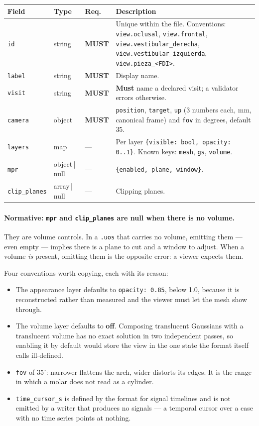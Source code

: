 \documentclass[11pt,a4paper]{article}
\newcommand{\MUST}{\textcolor{uosred}{\textbf{MUST}}}
\newcommand{\code}[1]{\texttt{\small #1}}
\begin{document}
\begin{longtable}{L{2.9cm} L{2.9cm} C{1.2cm} L{7.8cm}}
\toprule
\textbf{Field} & \textbf{Type} & \textbf{Req.} & \textbf{Description}\\
\midrule
\endhead
\code{id} & string & \MUST & Unique within the file. Conventions: \code{view.oclusal},
\code{view.frontal}, \code{view.vestibular\_derecha}, \code{view.vestibular\_izquierda},
\code{view.pieza\_<FDI>}.\\
\code{label} & string & \MUST & Display name.\\
\code{visit} & string & \MUST & \textbf{Must} name a declared visit; a validator errors
otherwise.\\
\code{camera} & object & \MUST & \code{position}, \code{target}, \code{up} (3 numbers each,
mm, canonical frame) and \code{fov} in degrees, default 35.\\
\code{layers} & map & --- & Per layer \code{\{visible: bool, opacity: 0..1\}}. Known keys:
\code{mesh}, \code{gs}, \code{volume}.\\
\code{mpr} & object\,|\,null & --- & \code{\{enabled, plane, window\}}. \\
\code{clip\_planes} & array\,|\,null & --- & Clipping planes.\\
\bottomrule
\end{longtable}

\paragraph{Normative: \code{mpr} and \code{clip\_planes} are null when there is no volume.}
They are volume controls. In a \code{.uos} that carries no volume, emitting them --- even
empty --- implies there is a plane to cut and a window to adjust. When a volume \emph{is}
present, omitting them is the opposite error: a viewer expects them.

\vspace{6px}
Four conventions worth copying, each with its reason:

\begin{itemize}
  \item The appearance layer defaults to \code{opacity: 0.85}, below 1.0, because it is
  reconstructed rather than measured and the viewer must let the mesh show through.
  \item The volume layer defaults to \textbf{off}. Composing translucent Gaussians with a
  translucent volume has no exact solution in two independent passes, so enabling it by
  default would store the view in the one state the format itself calls ill-defined.
  \item \code{fov} of 35$^\circ$: narrower flattens the arch, wider distorts its edges. It
  is the range in which a molar does not read as a cylinder.
  \item \code{time\_cursor\_s} is defined by the format for signal timelines and is not
  emitted by a writer that produces no signals --- a temporal cursor over a case with no
  time series points at nothing.
\end{itemize}
\end{document}
